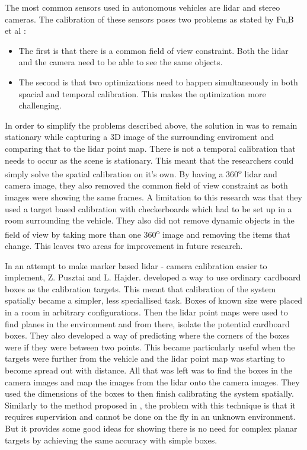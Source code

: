 The most common sensors used in autonomous vehicles are lidar and stereo cameras. The calibration of these sensors poses two problems as stated by Fu,B et al 
\cite{fuLiDARCameraCalibrationArbitrary2020}:
\begin{itemize}
    \item The first is that there is a common field of view constraint. Both the lidar and the camera need to be able to see the same objects. 
    \item The second is that two optimizations need to happen simultaneously in both spacial and temporal calibration. This makes the optimization more challenging. 
\end{itemize}
In order to simplify the problems described above, the solution in \cite{fuLiDARCameraCalibrationArbitrary2020} was to remain stationary while capturing a 3D image of the surrounding enviroment and comparing that to the lidar point map. There is not a temporal calibration that needs to occur as the scene is stationary. This meant that the researchers could simply solve the spatial calibration on it's own.
By having a 360\textsuperscript{o} lidar and camera image, they also removed the common field of view constraint as both images were showing the same frames. 
A limitation to this research was that they used a target based calibration with checkerboards which had to be set up in a room surrounding the vehicle. They also did not remove dynamic objects in the field of view by taking more than one 360\textsuperscript{o} image and removing the items that change. This leaves two areas for improvement in future research.




In an attempt to make marker based lidar - camera calibration easier to implement, Z. Pusztai and L. Hajder. \cite{pusztaiAccurateCalibrationLiDARCamera2017} developed a way to use ordinary cardboard boxes as the calibration targets. This meant that calibration of the system spatially became a simpler, less speciallised task. Boxes of known size were placed in a room in arbitrary configurations. Then the lidar point maps were used to find planes in the environment and from there, isolate the potential cardboard boxes. They also developed a  way of predicting where the corners of the boxes were if they were between two points. This became particularly useful when the targets were further from the vehicle and the lidar point map was starting to become spread out with distance.
All that was left was to find the boxes in the camera images and map the images from the lidar onto the camera images. They used the dimensions of the boxes to then finish calibrating the system spatially.
Similarly to the method proposed in \cite{fuLiDARCameraCalibrationArbitrary2020}, the problem with this technique is that it requires supervision and cannot be done on the fly in an unknown environment. But it provides some good ideas for showing there is no need for complex planar targets by achieving the same accuracy with simple boxes. 


